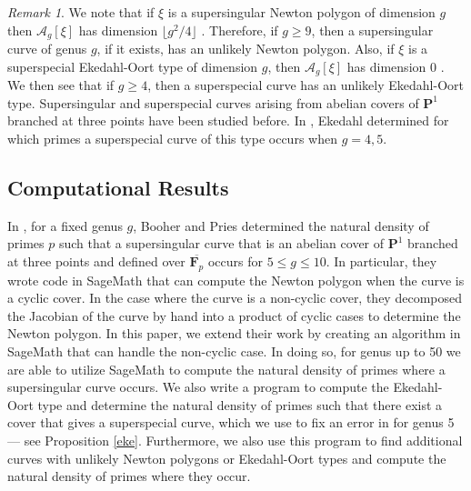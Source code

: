 \documentclass{article}
\theoremstyle{remark}
\newtheorem{remark}[theorem]{Remark}
\theoremstyle{definition}
\begin{document}
\begin{remark}
    We note that if $\xi$ is a supersingular Newton polygon of dimension $g$ then $\mathcal{A}_g[\xi]$ has dimension $\lfloor g^2/4 \rfloor$ \cite[Section 2.4]{pries_newtonpolygons}. Therefore, if $g \geq 9$, then a supersingular curve of genus $g$, if it exists, has an unlikely Newton polygon. Also, if $\xi$ is a superspecial Ekedahl-Oort type of dimension $g$, then $\mathcal{A}_g[\xi]$ has dimension $0$ \cite[Page 1]{oort_denominators}. We then see that if $g \geq 4$, then a superspecial curve has an unlikely Ekedahl-Oort type. Supersingular and superspecial curves arising from abelian covers of $\mathbf{P}^1$ branched at three points have been studied before. In \cite{ekedahl_supersingular_1987}, Ekedahl determined for which primes a superspecial curve of this type occurs when $g = 4,5$. 
\end{remark}


\subsection{Computational Results} \label{1.1}

\par \hspace{\parindent} In \cite{booher_supersingular_2025}, for a fixed genus $g$, Booher and Pries determined the natural density of primes $p$ such that a supersingular curve that is an abelian cover of $\mathbf{P}^1$ branched at three points and defined over $\overline{\mathbf{F}_p}$ occurs for $5 \leq g \leq 10$. In particular, they wrote code in SageMath that can compute the Newton polygon when the curve is a cyclic cover. In the case where the curve is a non-cyclic cover, they decomposed the Jacobian of the curve by hand into a product of cyclic cases to determine the Newton polygon. In this paper, we extend their work by creating an algorithm in SageMath that can handle the non-cyclic case. In doing so, for genus up to 50 we are able to utilize SageMath to compute the natural density of primes where a supersingular curve occurs. We also write a program to compute the Ekedahl-Oort type and determine the natural density of primes such that there exist a cover that gives a superspecial curve, which we use to fix an error in \cite{ekedahl_supersingular_1987} for genus 5 --- see Proposition \ref{eke}. Furthermore, we also use this program to find additional curves with unlikely Newton polygons or Ekedahl-Oort types and compute the natural density of primes where they occur.
\end{document}
